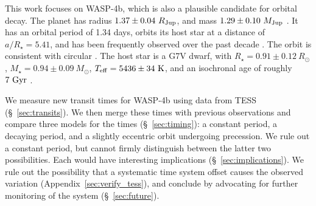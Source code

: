 \documentclass[12pt,twocolumn,tighten]{aastex62}
\begin{document}
% 
% 

This work focuses on WASP-4b, which is also a plausible candidate for
orbital decay.  The planet has radius $1.37 \pm 0.04\ R_{\rm Jup}$,
and mass $1.29 \pm 0.10\ M_{\rm Jup}$
\citep{southworth_homogeneous_2011}.  It has an orbital period of 1.34
days, orbits its host star at a distance of $a/R_\star = 5.41$, and
has been frequently observed over the past decade
\citep{wilson_wasp-4b_2008,huitson_gemini_2017}.  The orbit is
consistent with circular \citep[][but see
\S~\ref{sec:apsidal_precession}]{beerer_secondary_2011,husnoo_observational_2012,bonomo_gaps_2017}.
The host star is a G7V dwarf, with $R_\star = 0.91 \pm 0.12\ R_\odot$,
$M_\star = 0.94 \pm 0.09\ M_\odot$, $T_{\rm eff} = 5436 \pm 34\ {\rm
K}$, and an isochronal age of roughly $7\ {\rm Gyr}$
\citep{southworth_homogeneous_2011,petrucci_no_2013}.

We measure new transit times for WASP-4b using data from TESS
(\S~\ref{sec:transits}).  We then merge these times with previous
observations and compare three models for the times
(\S~\ref{sec:timing}): a constant period, a decaying period, and a
slightly eccentric orbit undergoing precession.  We rule out a
constant period, but cannot firmly distinguish between the latter two
possibilities.  Each would have interesting implications
(\S~\ref{sec:implications}).  We rule out the possibility that a
systematic time system offset causes the observed variation
(Appendix~\ref{sec:verify_tess}), and conclude by advocating for
further monitoring of the system (\S~\ref{sec:future}).
\end{document}
